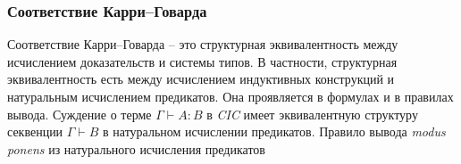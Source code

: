 \documentclass[12pt]{article}
\begin{document}
    
    
    
    
    
    
    

 







\subsubsection{Соответствие Карри--Говарда}
Соответствие Карри--Говарда -- это структурная эквивалентность между исчислением доказательств и системы типов. В частности, структурная эквивалентность есть между исчислением индуктивных конструкций и натуральным исчислением предикатов. Она проявляется в формулах и в правилах вывода. Суждение о терме $\Gamma \vdash A:B$ в \textit{CIC} имеет эквивалентную структуру секвенции $\Gamma \vdash B$ в натуральном исчислении предикатов. Правило вывода \textit{modus ponens} из натурального исчисления предикатов 
\end{document}
